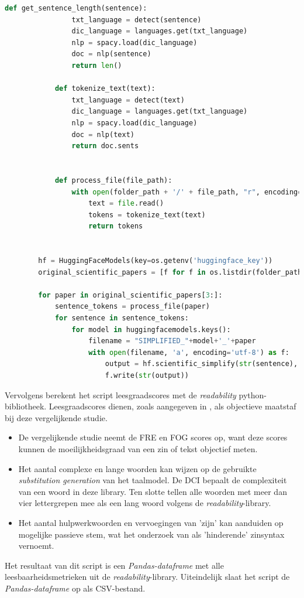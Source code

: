 \begin{center}
\begin{lstlisting}[language=Python, caption={Script voor de derde fase van de vergelijkende studie}, label={code:verg-studie-phase-3}]
			def get_sentence_length(sentence):
				txt_language = detect(sentence)
				dic_language = languages.get(txt_language)
				nlp = spacy.load(dic_language)
				doc = nlp(sentence)
				return len()	
			
			def tokenize_text(text):
				txt_language = detect(text)
				dic_language = languages.get(txt_language)
				nlp = spacy.load(dic_language)
				doc = nlp(text)
				return doc.sents
				
			
			def process_file(file_path):
				with open(folder_path + '/' + file_path, "r", encoding='utf8') as file:
					text = file.read()
					tokens = tokenize_text(text)
					return tokens
				
		
		hf = HuggingFaceModels(key=os.getenv('huggingface_key'))
		original_scientific_papers = [f for f in os.listdir(folder_path)]
		
		for paper in original_scientific_papers[3:]:
			sentence_tokens = process_file(paper) 
			for sentence in sentence_tokens:
				for model in huggingfacemodels.keys():
					filename = "SIMPLIFIED_"+model+'_'+paper
					with open(filename, 'a', encoding='utf-8') as f:
						output = hf.scientific_simplify(str(sentence), model)
						f.write(str(output)) 	
	\end{lstlisting}
\end{center}

Vervolgens berekent het script leesgraadscores met de \textit{readability} python-bibliotheek. Leesgraadscores dienen, zoals aangegeven in \textcite{Nenkova2004}, als objectieve maatstaf bij deze vergelijkende studie. 

\begin{itemize}
	\item De vergelijkende studie neemt de FRE en FOG scores op, want deze scores kunnen de moeilijkheidsgraad van een zin of tekst objectief meten.
	\item Het aantal complexe en lange woorden kan wijzen op de gebruikte \textit{substitution generation} van het taalmodel. De DCI bepaalt de complexiteit van een woord in deze library. Ten slotte tellen alle woorden met meer dan vier lettergrepen mee als een lang woord volgens de \textit{readability}-library.
	\item Het aantal hulpwerkwoorden en vervoegingen van 'zijn' kan aanduiden op mogelijke passieve stem, wat het onderzoek van \textcite{Ruelas2020} als 'hinderende' zinsyntax vernoemt.
\end{itemize}

Het resultaat van dit script is een \textit{Pandas-dataframe} met alle leesbaarheidsmetrieken uit de \textit{readability}-library. Uiteindelijk slaat het script de \textit{Pandas-dataframe} op als CSV-bestand.

